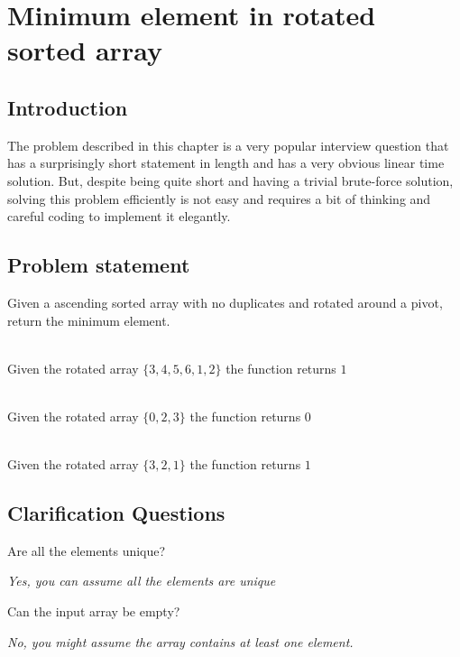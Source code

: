 %

\chapter{Minimum element in rotated sorted array}
\label{ch:min_rotated_array}
\section*{Introduction}
The problem described in this chapter is a very popular interview question that has a surprisingly short statement in length and has a very obvious linear time solution. But, despite being quite short and having a trivial  brute-force solution, solving this problem efficiently is not easy and requires a bit of thinking and careful coding to implement it elegantly. 

\section{Problem statement}
\begin{exercise}
Given a ascending sorted array with no duplicates and rotated around a pivot, return the minimum element.

	\begin{example}
		\hfill \\
		Given the rotated array $\{3,4,5,6,1,2\}$ the function returns $1$
	\end{example}

	\begin{example}
		\hfill \\
		Given the rotated array $\{0,2,3\}$ the function returns $0$
	\end{example}

	\begin{example}
		\hfill \\
		Given the rotated array $\{3,2,1\}$ the function returns $1$
	\end{example}
\end{exercise}

\section{Clarification Questions}

\begin{QandA}
	\item Are all the elements unique? 
	\begin{answered}
		\textit{Yes, you can assume all the elements are unique}
	\end{answered}
	\item Can the input array be empty?
	\begin{answered}
		\textit{No, you might assume the array contains at least one element.}
	\end{answered}
\end{QandA}

